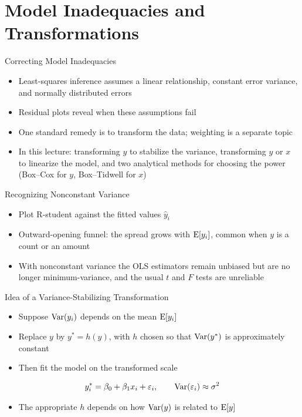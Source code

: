 \section{Model Inadequacies and Transformations}


\begin{frame}{Correcting Model Inadequacies}
\begin{itemize}
    \item Least-squares inference assumes a linear relationship, constant error variance, and normally distributed errors
    \item Residual plots reveal when these assumptions fail
    \item One standard remedy is to transform the data; weighting is a separate topic
    \item In this lecture: transforming $y$ to stabilize the variance, transforming $y$ or $x$ to linearize the model, and two analytical methods for choosing the power (Box--Cox for $y$, Box--Tidwell for $x$)
\end{itemize}
\end{frame}


\begin{frame}{Recognizing Nonconstant Variance}
\begin{itemize}
    \item Plot R-student against the fitted values $\hat{y}_i$
    \item Outward-opening funnel: the spread grows with $\operatorname{E}[y_i]$, common when $y$ is a count or an amount
    \item With nonconstant variance the OLS estimators remain unbiased but are no longer minimum-variance, and the usual $t$ and $F$ tests are unreliable
\end{itemize}
\end{frame}


\begin{frame}{Idea of a Variance-Stabilizing Transformation}
\begin{itemize}
    \item Suppose $\operatorname{Var}(y_i)$ depends on the mean $\operatorname{E}[y_i]$
    \item Replace $y$ by $y^* = h(y)$, with $h$ chosen so that $\operatorname{Var}(y^*)$ is approximately constant
    \item Then fit the model on the transformed scale
\end{itemize}
\begin{align*}
    y_i^* = \beta_0 + \beta_1 x_i + \varepsilon_i, \qquad \operatorname{Var}(\varepsilon_i) \approx \sigma^2
\end{align*}
\begin{itemize}
    \item The appropriate $h$ depends on how $\operatorname{Var}(y)$ is related to $\operatorname{E}[y]$
\end{itemize}
\end{frame}



